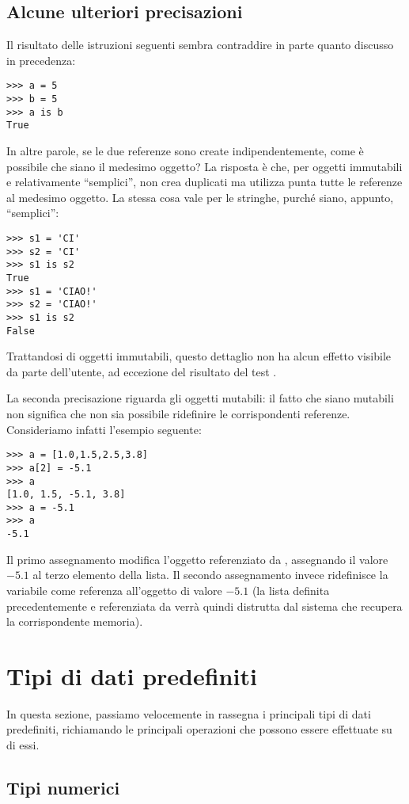 \subsection{Alcune ulteriori precisazioni}

Il risultato delle istruzioni seguenti sembra contraddire in parte quanto
discusso in precedenza:
\begin{verbatim}
>>> a = 5
>>> b = 5
>>> a is b
True
\end{verbatim}
In altre parole, se le due referenze sono create indipendentemente, come \`e
possibile che siano il medesimo oggetto? La risposta \`e che, per oggetti
immutabili e relativamente ``semplici'', \python non crea duplicati ma utilizza
punta tutte le referenze al medesimo oggetto. La stessa cosa vale per le
stringhe, purch\'e siano, appunto, ``semplici'':
\begin{verbatim}
>>> s1 = 'CI'
>>> s2 = 'CI'
>>> s1 is s2
True
>>> s1 = 'CIAO!'
>>> s2 = 'CIAO!'
>>> s1 is s2
False
\end{verbatim}
Trattandosi di oggetti immutabili, questo dettaglio non ha alcun effetto
visibile da parte dell'utente, ad eccezione del risultato del test .

La seconda precisazione riguarda gli oggetti mutabili: il fatto che siano
mutabili non significa che non sia possibile ridefinire le corrispondenti
referenze. Consideriamo infatti l'esempio seguente:
\begin{verbatim}
>>> a = [1.0,1.5,2.5,3.8]
>>> a[2] = -5.1
>>> a
[1.0, 1.5, -5.1, 3.8]
>>> a = -5.1
>>> a
-5.1
\end{verbatim}
Il primo assegnamento modifica l'oggetto referenziato da , assegnando il
valore $-5.1$ al terzo elemento della lista. Il secondo assegnamento invece
ridefinisce la variabile  come referenza all'oggetto  di
valore $-5.1$ (la lista definita precedentemente e referenziata da 
verr\`a quindi distrutta dal sistema che recupera la corrispondente memoria).

\section{Tipi di dati predefiniti}

In questa sezione, passiamo velocemente in rassegna i principali tipi di dati
predefiniti, richiamando le principali operazioni che possono essere effettuate
su di essi.

\subsection{Tipi numerici}

